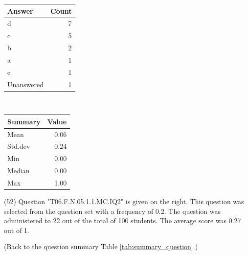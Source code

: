 \documentclass[12pt,nohyper]{tufte-handout}\usepackage[]{graphicx}\usepackage[]{color}
\begin{document}
\begin{center}%
\begin{tabular}{lr}
  \hline
Answer & Count \\ 
  \hline
d &   7 \\ 
  c &   5 \\ 
  b &   2 \\ 
  a &   1 \\ 
  e &   1 \\ 
  Unanswered &   1 \\ 
   \hline
\end{tabular}
~~~~~~~~%
\begin{tabular}{lr}
  \hline
Summary & Value \\ 
  \hline
Mean & 0.06 \\ 
  Std.dev & 0.24 \\ 
  Min & 0.00 \\ 
  Median & 0.00 \\ 
  Max & 1.00 \\ 
   \hline
\end{tabular}
\end{center}\newpage{} (52) Question "T06.F.N.05.1.1.MC.IQ2" is given on the right. This question was selected from the question set with a frequency of 0.2. The question was administered to 22 out of the total of 100 students. The average score was 0.27 out of 1.

 (Back to the question summary Table \ref{tab:summary_question}.)
\end{document}
